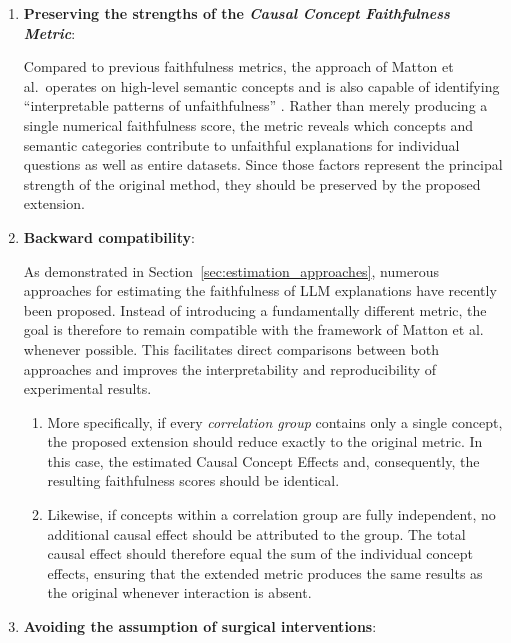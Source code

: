 \begin{enumerate}[label=\textbf{D\arabic*}]
    \item \label{des:preserving_strengths} \textbf{Preserving the strengths of the \emph{Causal Concept Faithfulness Metric}}:
    
    Compared to previous faithfulness metrics, the approach of Matton et al.\ operates on high-level semantic concepts and is also capable of identifying \enquote{interpretable patterns of unfaithfulness} \cite{mattonWalkTalkMeasuring2024}. Rather than merely producing a single numerical faithfulness score, the metric reveals which concepts and semantic categories contribute to unfaithful explanations for individual questions as well as entire datasets. Since those factors represent the principal strength of the original method, they should be preserved by the proposed extension.

    \item \label{des:backward_compatibility} \textbf{Backward compatibility}:
    
    As demonstrated in Section~\ref{sec:estimation_approaches}, numerous approaches for estimating the faithfulness of LLM explanations have recently been proposed. Instead of introducing a fundamentally different metric, the goal is therefore to remain compatible with the framework of Matton et al. whenever possible. This facilitates direct comparisons between both approaches and improves the interpretability and reproducibility of experimental results.
    \begin{enumerate}[label*=.\arabic*]
     \item \label{des:one_item_group} More specifically, if every \emph{correlation group} contains only a single concept, the proposed extension should reduce exactly to the original metric. In this case, the estimated Causal Concept Effects and, consequently, the resulting faithfulness scores should be identical.
     \item \label{des:independence_behavior} Likewise, if concepts within a correlation group are fully independent, no additional causal effect should be attributed to the group. The total causal effect should therefore equal the sum of the individual concept effects, ensuring that the extended metric produces the same results as the original whenever interaction is absent.
     \end{enumerate}

    \item \label{des:no_surgical} \textbf{Avoiding the assumption of surgical interventions}:
    

\end{enumerate}
